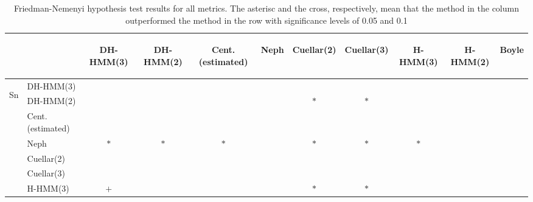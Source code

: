 \documentclass[landscape, 8pt]{report}
\begin{document}
\begin{table}[h!]
\label{tab:friedman.nemenyi}
\vspace{0.0cm}
\begin{center}
\caption{Friedman-Nemenyi hypothesis test results for all metrics. The asterisc and the cross, respectively, mean that the method in the column outperformed the method in the row with significance levels of 0.05 and 0.1}
\renewcommand{\arraystretch}{1.2}
  \begin{tabular}{ llccccccccc }
  \hline
  & & \begin{sideways}DH-HMM(3)\end{sideways} &
  \begin{sideways}DH-HMM(2)\end{sideways} &
  \begin{sideways}Cent.(estimated)\end{sideways} &
  \begin{sideways}Neph\end{sideways} &
  \begin{sideways}Cuellar(2)\end{sideways} &
  \begin{sideways}Cuellar(3)\end{sideways} &
  \begin{sideways}H-HMM(3)\end{sideways} &
  \begin{sideways}H-HMM(2)\end{sideways} &
  \begin{sideways}Boyle\end{sideways} \\
  \hline
    \multirow{9}{*}{\begin{sideways}Sn\end{sideways}}
    & DH-HMM(3) &     &     &     &     &     &     &     &     &     \\
    & DH-HMM(2) &     &     &     &     & $*$ & $*$ &     &     &     \\
    & Cent.(estimated) &     &     &     &     &     &     &     &     &     \\
    & Neph & $*$ & $*$ & $*$ &     & $*$ & $*$ & $*$ &     &     \\
    & Cuellar(2) &     &     &     &     &     &     &     &     &     \\
    & Cuellar(3) &     &     &     &     &     &     &     &     &     \\
    & H-HMM(3) & $+$ &     &     &     & $*$ & $*$ &     &     &     \\

\end{tabular}
\end{center}
\end{table}
\end{document}
